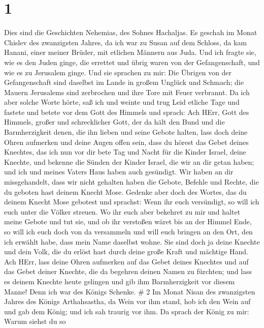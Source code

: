 \hypertarget{section}{%
\section{1}\label{section}}

 Dies sind die Geschichten Nehemias, des Sohnes Hachaljas.
Es geschah im Monat Chislev des zwanzigsten Jahres, da ich war zu Susan
auf dem Schloss,  da kam Hanani, einer meiner Brüder, mit
etlichen Männern aus Juda. Und ich fragte sie, wie es den Juden ginge,
die errettet und übrig waren von der Gefangenschaft, und wie es zu
Jerusalem ginge.  Und sie sprachen zu mir: Die Übrigen von
der Gefangenschaft sind daselbst im Lande in großem Unglück und Schmach;
die Mauern Jerusalems sind zerbrochen und ihre Tore mit Feuer verbrannt.
 Da ich aber solche Worte hörte, saß ich und weinte und trug
Leid etliche Tage und fastete und betete vor dem Gott des Himmels
 und sprach: Ach HErr, Gott des Himmels, großer und
schrecklicher Gott, der da hält den Bund und die Barmherzigkeit denen,
die ihn lieben und seine Gebote halten,  lass doch deine
Ohren aufmerken und deine Augen offen sein, dass du hörest das Gebet
deines Knechtes, das ich nun vor dir bete Tag und Nacht für die Kinder
Israel, deine Knechte, und bekenne die Sünden der Kinder Israel, die wir
an dir getan haben; und ich und meines Vaters Haus haben auch gesündigt.
 Wir haben an dir missgehandelt, dass wir nicht gehalten
haben die Gebote, Befehle und Rechte, die du geboten hast deinem Knecht
Mose.  Gedenke aber doch des Wortes, das du deinem Knecht
Mose gebotest und sprachst: Wenn ihr euch versündigt, so will ich euch
unter die Völker streuen.  Wo ihr euch aber bekehret zu mir
und haltet meine Gebote und tut sie, und ob ihr verstoßen wäret bis an
der Himmel Ende, so will ich euch doch von da versammeln und will euch
bringen an den Ort, den ich erwählt habe, dass mein Name daselbst wohne.
 Sie sind doch ja deine Knechte und dein Volk, die du
erlöst hast durch deine große Kraft und mächtige Hand.  Ach
HErr, lass deine Ohren aufmerken auf das Gebet deines Knechtes und auf
das Gebet deiner Knechte, die da begehren deinen Namen zu fürchten; und
lass es deinem Knechte heute gelingen und gib ihm Barmherzigkeit vor
diesem Manne! Denn ich war des Königs Schenke. \# 2  Im
Monat Nisan des zwanzigsten Jahres des Königs Arthahsastha, da Wein vor
ihm stand, hob ich den Wein auf und gab dem König; und ich sah traurig
vor ihm.  Da sprach der König zu mir: Warum siehst du so
